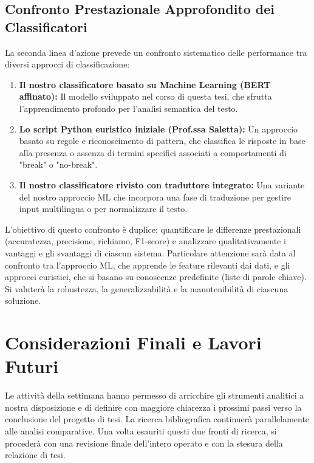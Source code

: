 \documentclass[11pt, a4paper]{article}
\begin{document}
\subsection{Confronto Prestazionale Approfondito dei Classificatori}
La seconda linea d'azione prevede un confronto sistematico delle performance tra diversi approcci di classificazione:
\begin{enumerate}
    \item \textbf{Il nostro classificatore basato su Machine Learning (BERT affinato):} Il modello sviluppato nel corso di questa tesi, che sfrutta l'apprendimento profondo per l'analisi semantica del testo.
    \item \textbf{Lo script Python euristico iniziale (Prof.ssa Saletta):} Un approccio basato su regole e riconoscimento di pattern, che classifica le risposte in base alla presenza o assenza di termini specifici associati a comportamenti di "break" o "no-break".
    \item \textbf{Il nostro classificatore rivisto con traduttore integrato:} Una variante del nostro approccio ML che incorpora una fase di traduzione per gestire input multilingua o per normalizzare il testo.
\end{enumerate}
L'obiettivo di questo confronto è duplice: quantificare le differenze prestazionali (accuratezza, precisione, richiamo, F1-score) e analizzare qualitativamente i vantaggi e gli svantaggi di ciascun sistema. Particolare attenzione sarà data al confronto tra l'approccio ML, che apprende le feature rilevanti dai dati, e gli approcci euristici, che si basano su conoscenze predefinite (liste di parole chiave). Si valuterà la robustezza, la generalizzabilità e la manutenibilità di ciascuna soluzione.

\section{Considerazioni Finali e Lavori Futuri}
Le attività della settimana hanno permesso di arricchire gli strumenti analitici a nostra disposizione e di definire con maggiore chiarezza i prossimi passi verso la conclusione del progetto di tesi. La ricerca bibliografica continuerà parallelamente alle analisi comparative. Una volta esauriti questi due fronti di ricerca, si procederà con una revisione finale dell'intero operato e con la stesura della relazione di tesi.
\end{document}

